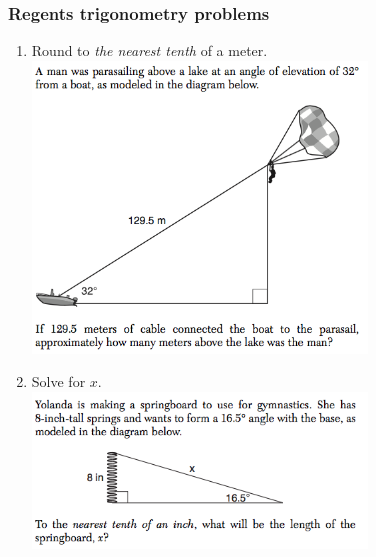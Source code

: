 \documentclass[12pt, twoside]{article}
\begin{document}
\subsubsection*{Regents trigonometry problems}
  \begin{enumerate}
  \item Round to \emph{the nearest tenth} of a meter.\\
  \includegraphics[width=0.7\textwidth]{trig-boat.png} \vspace{3cm}
  \item Solve for $x$.\\
  \includegraphics[width=0.7\textwidth]{trig-spring.png}
  \end{enumerate}
\end{document}

